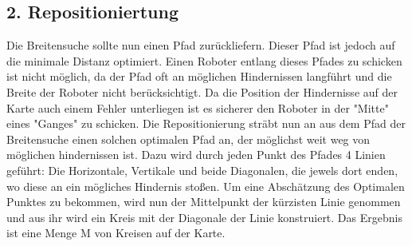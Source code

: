 \documentclass[11pt,a4paper,oneside,onecolumn]{scrartcl}
\begin{document}
\subsection*{2. Repositioniertung}
	Die Breitensuche sollte nun einen Pfad zurückliefern. Dieser Pfad ist jedoch auf die minimale Distanz optimiert. Einen Roboter entlang dieses Pfades zu schicken ist nicht möglich, da der Pfad oft an möglichen Hindernissen langführt und die Breite der Roboter nicht berücksichtigt. Da die Position der Hindernisse auf der Karte auch einem Fehler unterliegen ist es sicherer den Roboter in der "Mitte" eines "Ganges" zu schicken. Die Repositionierung sträbt nun an aus dem Pfad der Breitensuche einen solchen optimalen Pfad an, der möglichst weit weg von möglichen hindernissen ist. Dazu wird durch jeden Punkt des Pfades 4 Linien geführt: Die Horizontale, Vertikale und beide Diagonalen, die jewels dort enden, wo diese an ein mögliches Hindernis stoßen. Um eine Abschätzung des Optimalen Punktes zu bekommen, wird nun der Mittelpunkt der kürzisten Linie genommen und aus ihr wird ein Kreis mit der Diagonale der Linie konstruiert. Das Ergebnis ist eine Menge M von Kreisen auf der Karte. \\
\end{document}
